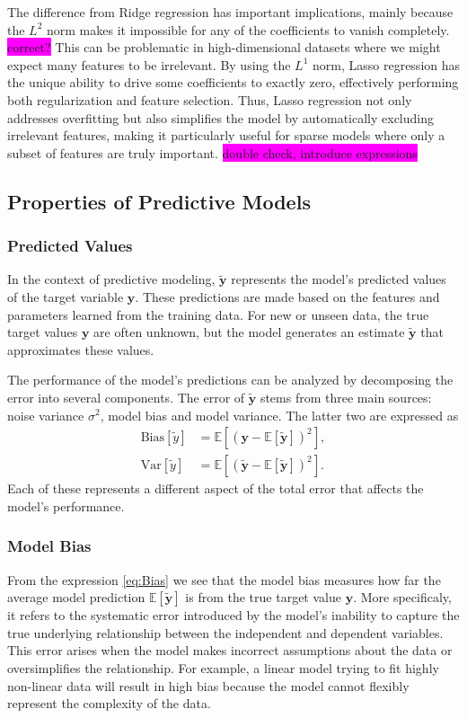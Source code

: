 \documentclass[aps,pra,english,notitlepage,reprint,nofootinbib]{revtex4-1}  %
\begin{document}
The difference from Ridge regression has important implications, mainly because the $L^2$ norm makes it impossible for any of the coefficients to vanish completely. \colorbox{magenta}{correct?} This can be problematic in high-dimensional datasets where we might expect many features to be irrelevant. By using the $L^1$ norm, Lasso regression has the unique ability to drive some coefficients to exactly zero, effectively performing both regularization and feature selection. Thus, Lasso regression not only addresses overfitting but also simplifies the model by automatically excluding irrelevant features, making it particularly useful for sparse models where only a subset of features are truly important.
\colorbox{magenta}{double check, introduce expressions}


\subsection{Properties of Predictive Models}\label{subsec:tradeoff}
\subsubsection{Predicted Values}
In the context of predictive modeling, $\mathbf{\tilde{y}}$ represents the model's predicted values of the target variable $\mathbf{y}$. These predictions are made based on the features and parameters learned from the training data. For new or unseen data, the true target values $\mathbf{y}$ are often unknown, but the model generates an estimate $\mathbf{\tilde{y}}$ that approximates these values.

The performance of the model's predictions can be analyzed by decomposing the error into several components. The error of $\mathbf{\tilde{y}}$ stems from three main sources: noise variance $\sigma^2$, model bias and model variance. The latter two are expressed as
\begin{align}
  \text{Bias}\left[\tilde{y}\right] &= \mathbb{E}\left[\left(\mathbf{y}-\mathbb{E}\left[\mathbf{\tilde{y}}\right] \right)^2\right], \label{eq:Bias}
  \\
  \text{Var}\left[\tilde{y}\right] &= \mathbb{E}\left[\left(\mathbf{\tilde{y}}-\mathbb{E}\left[\mathbf{\tilde{y}}\right] \right)^2\right]. \label{eq:Var}
\end{align}
Each of these represents a different aspect of the total error that affects the model's performance.

\subsubsection{Model Bias}
From the expression \eqref{eq:Bias} we see that the model bias measures how far the average model prediction $\mathbb{E}[\mathbf{\tilde{y}}]$ is from the true target value $\mathbf{y}$. More specificaly, it refers to the systematic error introduced by the model's inability to capture the true underlying relationship between the independent and dependent variables. This error arises when the model makes incorrect assumptions about the data or oversimplifies the relationship. For example, a linear model trying to fit highly non-linear data will result in high bias because the model cannot flexibly represent the complexity of the data.
\end{document}
